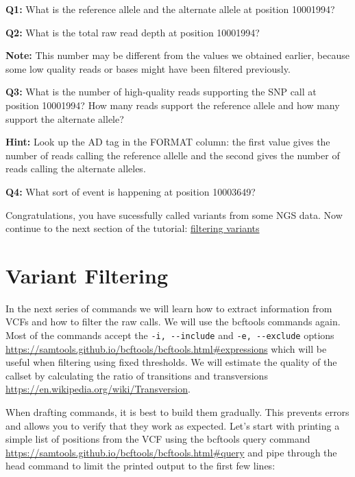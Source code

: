 \documentclass[11pt]{article}
\begin{document}
    \textbf{Q1:} What is the reference allele and the alternate allele at
position 10001994?

\textbf{Q2:} What is the total raw read depth at position 10001994?

\textbf{Note:} This number may be different from the values we obtained
earlier, because some low quality reads or bases might have been
filtered previously.

\textbf{Q3:} What is the number of high-quality reads supporting the SNP
call at position 10001994? How many reads support the reference allele
and how many support the alternate allele?

\textbf{Hint:} Look up the AD tag in the FORMAT column: the first value
gives the number of reads calling the reference allelle and the second
gives the number of reads calling the alternate alleles.

\textbf{Q4:} What sort of event is happening at position 10003649?

    Congratulations, you have sucessfully called variants from some NGS
data. Now continue to the next section of the tutorial:
\href{filtering.ipynb}{filtering variants}





\newpage





    \hypertarget{variant-filtering}{%
\section{Variant Filtering}\label{variant-filtering}}

    In the next series of commands we will learn how to extract information
from VCFs and how to filter the raw calls. We will use the bcftools
commands again. Most of the commands accept the
\texttt{-i,\ -\/-include} and \texttt{-e,\ -\/-exclude} options
\url{https://samtools.github.io/bcftools/bcftools.html\#expressions}
which will be useful when filtering using fixed thresholds. We will
estimate the quality of the callset by calculating the ratio of
transitions and transversions
\url{https://en.wikipedia.org/wiki/Transversion}.

When drafting commands, it is best to build them gradually. This
prevents errors and allows you to verify that they work as expected.
Let's start with printing a simple list of positions from the VCF using
the bcftools query command
\url{https://samtools.github.io/bcftools/bcftools.html\#query} and pipe
through the head command to limit the printed output to the first few
lines:
\end{document}
